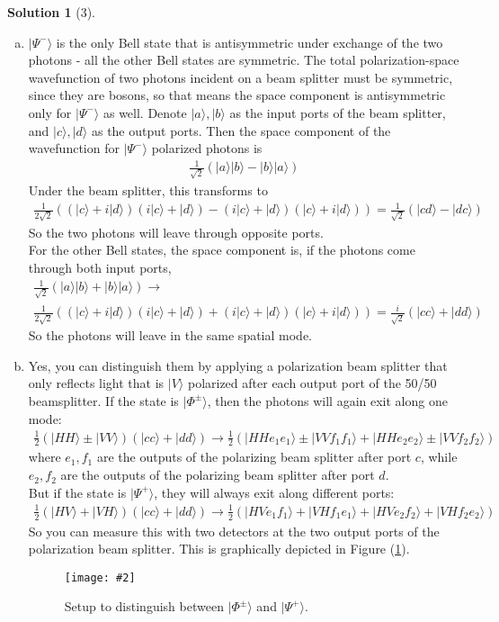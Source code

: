 \documentclass[11pt]{article}
\theoremstyle{definition}
\newtheorem*{solution}{Solution}
\newcommand{\eq}{\begin{equation}\begin{aligned}}
\newcommand{\qe}{\end{aligned}\end{equation}}
\newcommand{\ket}[1]{|#1\rangle}
\newcommand{\img}[4][0.5\textwidth]{
  \begin{figure}[h]
    \centering
    \texttt{[image: \#2]}
    \caption{#3}
    \label{#4}
  \end{figure}
}
\begin{document}
\begin{solution}[3]
  \begin{enumerate}[(a)]
    \item $\ket{\Psi^-}$ is the only Bell state that is antisymmetric under exchange of the two photons - all the other Bell states are symmetric. The total polarization-space wavefunction of two photons incident on a beam splitter must be symmetric, since they are bosons, so that means the space component is antisymmetric only for $\ket{\Psi^-}$ as well. Denote $\ket{a},\ket{b}$ as the input ports of the beam splitter, and $\ket{c},\ket{d}$ as the output ports. Then the space component of the wavefunction for $\ket{\Psi^-}$ polarized photons is
    \eq
      \frac{1}{\sqrt{2}}(\ket{a}\ket{b}-\ket{b}\ket{a})
    \qe
    Under the beam splitter, this transforms to
    \eq
      \frac{1}{2\sqrt{2}}((\ket{c}+i\ket{d})(i\ket{c}+\ket{d})-(i\ket{c}+\ket{d})(\ket{c}+i\ket{d}))=\frac{1}{\sqrt{2}}(\ket{cd}-\ket{dc})
    \qe
    So the two photons will leave through opposite ports.\\
    For the other Bell states, the space component is, if the photons come through both input ports,
    \eq
      \frac{1}{\sqrt{2}}(\ket{a}\ket{b}+\ket{b}\ket{a})\to \\
      \frac{1}{2\sqrt{2}}((\ket{c}+i\ket{d})(i\ket{c}+\ket{d})+(i\ket{c}+\ket{d})(\ket{c}+i\ket{d}))=\frac{i}{\sqrt{2}}(\ket{cc}+\ket{dd})
    \qe
    So the photons will leave in the same spatial mode.
    \item Yes, you can distinguish them by applying a polarization beam splitter that only reflects light that is $\ket{V}$ polarized after each output port of the 50/50 beamsplitter. If the state is $\ket{\Phi^{\pm}}$, then the photons will again exit along one mode:
    \eq
      \frac{1}{2}(\ket{HH}\pm\ket{VV})(\ket{cc}+\ket{dd})\to \frac{1}{2}(\ket{HHe_1e_1}\pm\ket{VVf_1f_1}+\ket{HHe_2e_2}\pm\ket{VVf_2f_2})
    \qe
    where $e_1,f_1$ are the outputs of the polarizing beam splitter after port $c$, while $e_2,f_2$ are the outputs of the polarizing beam splitter after port $d$.\\
    But if the state is $\ket{\Psi^+}$, they will always exit along different ports:
    \eq
      \frac{1}{2}(\ket{HV}+\ket{VH})(\ket{cc}+\ket{dd})\to \frac{1}{2}(\ket{HVe_1f_1}+\ket{VHf_1e_1}+\ket{HVe_2f_2}+\ket{VHf_2e_2})
    \qe
    So you can measure this with two detectors at the two output ports of the polarization beam splitter. This is graphically depicted in Figure (\ref{fig:dist}).
    \img{3b}{Setup to distinguish between $\ket{\Phi^{\pm}}$ and $\ket{\Psi^+}$.}{fig:dist}

\end{enumerate}
\end{solution}
\end{document}
